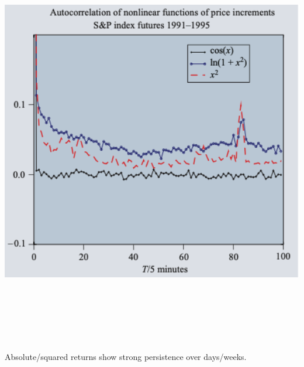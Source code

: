 \documentclass[final]{beamer}
\begin{document}
\begin{frame}[t]
\begin{columns}[t]
\begin{column}{.48\linewidth}
\begin{tcolorbox}[mybox, title=Nonlinear Correlations]
\begin{center}
\includegraphics[width=0.95\linewidth,height=18cm,keepaspectratio]{figure8_nonlinear.png}
\end{center}
\vspace{0.3cm}
\large
Absolute/squared returns show strong persistence over days/weeks.
\end{tcolorbox}

\vspace{0.5cm}


\end{column}
\end{columns}
\end{frame}
\end{document}
